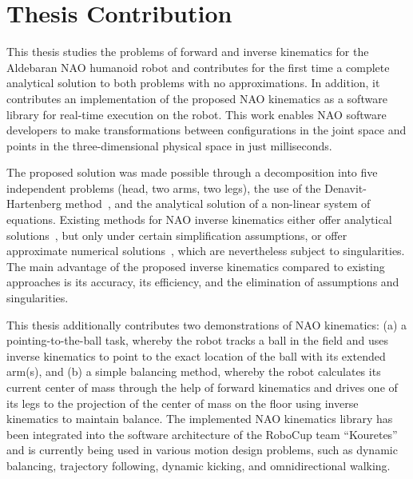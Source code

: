 \section{Thesis Contribution}
This thesis studies the problems of forward and inverse kinematics for the Aldebaran NAO humanoid robot and contributes for the first time a complete analytical solution to both problems with no approximations. In addition, it contributes an implementation of the proposed NAO kinematics as a software library for real-time execution on the robot. This work enables NAO software developers to make transformations between configurations in the joint space and points in the three-dimensional physical space in just milliseconds. 

The proposed solution was made possible through a decomposition into five independent problems (head, two arms, two legs), the use of the Denavit-Hartenberg method~\cite{dhparam1,dhparam2}, and the analytical solution of a non-linear system of equations. Existing methods for NAO inverse kinematics either offer analytical solutions~\cite{bhuman}, but only under certain simplification assumptions, or offer approximate numerical solutions~\cite{naopaper}, which are nevertheless subject to singularities. The main advantage of the proposed inverse kinematics compared to existing approaches is its accuracy, its efficiency, and the elimination of assumptions and singularities.   

This thesis additionally contributes two demonstrations of NAO kinematics: (a) a pointing-to-the-ball task, whereby the robot tracks a ball in the field and uses inverse kinematics to point to the exact location of the ball with its extended arm(s), and (b) a simple balancing method, whereby the robot calculates its current center of mass through the help of forward kinematics and drives one of its legs to the projection of the center of mass on the floor using inverse kinematics to maintain balance. The implemented NAO kinematics library has been integrated into the software architecture of the RoboCup team ``Kouretes'' and is currently being used in various motion design problems, such as dynamic balancing, trajectory following, dynamic kicking, and omnidirectional walking.

